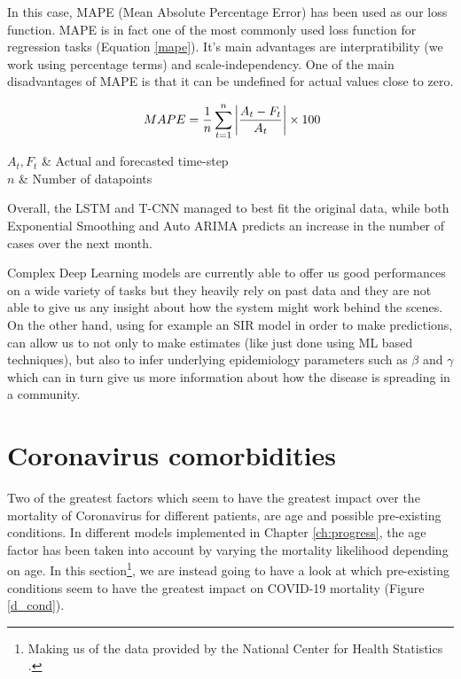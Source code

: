 In this case, MAPE (Mean Absolute Percentage Error) has been used as our loss function. 
MAPE is in fact one of the most commonly used loss function for regression tasks (Equation \ref{mape}). It's main advantages are interpratibility (we work using percentage terms) and scale-independency. One of the main disadvantages of MAPE is that it can be undefined for actual values close to zero.

\useshortskip
\begin{align}
\ MAPE = \dfrac{1}{n} \sum_{t=1}^{n} \abs{\frac{A_{t}-F_{t}}{A_{t}}} \times 100
\label{mape}
\end{align}
\vspace{-0.4cm}
\begin{conditions}
 $A_{t}, F_{t}$  &  Actual and forecasted time-step \\
 $n$  &  Number of datapoints\\
\end{conditions}
\vspace{-0.2cm}
\useshortskip

Overall, the LSTM and T-CNN managed to best fit the original data, while both Exponential Smoothing and Auto ARIMA predicts an increase in the number of cases over the next month.

Complex Deep Learning models are currently able to offer us good performances on a wide variety of tasks but they heavily rely on past data and they are not able to give us any insight about how the system might work behind the scenes. On the other hand, using for example an SIR model in order to make predictions, can allow us to not only to make estimates (like just done using ML based techniques), but also to infer underlying epidemiology parameters such as $\beta$ and $\gamma$ which can in turn give us more information about how the disease is spreading in a community.

\section{Coronavirus comorbidities}
\label{como_app}
Two of the greatest factors which seem to have the greatest impact over the mortality of Coronavirus for different patients, are age and possible pre-existing conditions. In different models implemented in Chapter \ref{ch:progress}, the age factor has been taken into account by varying the mortality likelihood depending on age. In this section\footnote{Making us of the data provided by the National Center for Health Statistics \cite{deaths_data}.}, we are instead going to have a look at which pre-existing conditions seem to have the greatest impact on COVID-19 mortality (Figure \ref{d_cond}). 

